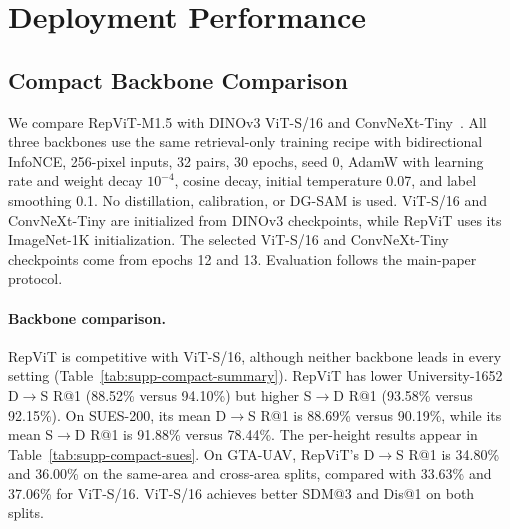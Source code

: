 \section{Deployment Performance}

\subsection{Compact Backbone Comparison}
\label{sec:supp-compact}
We compare RepViT-M1.5 with DINOv3 ViT-S/16 and ConvNeXt-Tiny~\cite{simeoni2025dinov3}. All three backbones use the same retrieval-only training recipe with bidirectional InfoNCE, 256-pixel inputs, 32 pairs, 30 epochs, seed 0, AdamW with learning rate and weight decay $10^{-4}$, cosine decay, initial temperature 0.07, and label smoothing 0.1. No distillation, calibration, or DG-SAM is used. ViT-S/16 and ConvNeXt-Tiny are initialized from DINOv3 checkpoints, while RepViT uses its ImageNet-1K initialization. The selected ViT-S/16 and ConvNeXt-Tiny checkpoints come from epochs 12 and 13. Evaluation follows the main-paper protocol.





\paragraph{Backbone comparison.}
RepViT is competitive with ViT-S/16, although neither backbone leads in every setting (Table~\ref{tab:supp-compact-summary}). RepViT has lower University-1652 D$\rightarrow$S R@1 (88.52\% versus 94.10\%) but higher S$\rightarrow$D R@1 (93.58\% versus 92.15\%). On SUES-200, its mean D$\rightarrow$S R@1 is 88.69\% versus 90.19\%, while its mean S$\rightarrow$D R@1 is 91.88\% versus 78.44\%. The per-height results appear in Table~\ref{tab:supp-compact-sues}. On GTA-UAV, RepViT's D$\rightarrow$S R@1 is 34.80\% and 36.00\% on the same-area and cross-area splits, compared with 33.63\% and 37.06\% for ViT-S/16. ViT-S/16 achieves better SDM@3 and Dis@1 on both splits.

